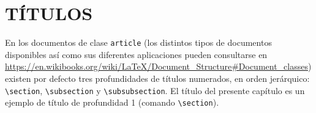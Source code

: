 \documentclass[a4paper, 11pt, spanish, twoside]{article}
\newcommand\blankpage{%
    \null
    \thispagestyle{empty}%
    \newpage}
\begin{document}
\newpage

\renewcommand{\listtablename}{ÍNDICE DE TABLAS} %
\listoftables %




\newpage

\renewcommand{\listfigurename}{ÍNDICE DE FIGURAS} %
\listoffigures %




\newpage

\listofcodes %

\afterpage{\blankpage} %




\newpage
{}




\section{TÍTULOS} \label{sec:titulos}

En los documentos de clase \texttt{article} (los distintos tipos de documentos disponibles así como sus diferentes aplicaciones pueden consultarse en \url{https://en.wikibooks.org/wiki/LaTeX/Document_Structure#Document_classes}) existen por defecto tres profundidades de títulos numerados, en orden jerárquico: \texttt{\textbackslash section}, \texttt{\textbackslash subsection} y \texttt{\textbackslash subsubsection}. El título del presente capítulo es un ejemplo de título de profundidad 1 (comando \texttt{\textbackslash section}).
\end{document}
